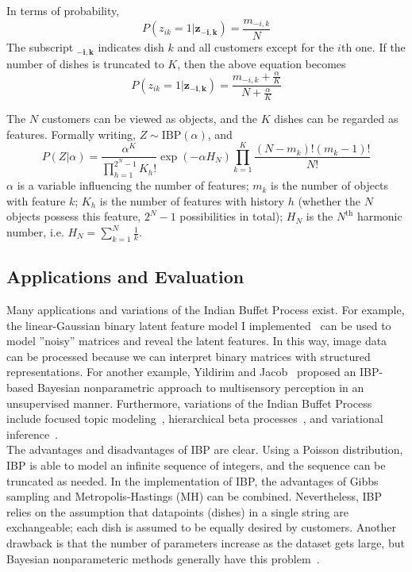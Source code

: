 In terms of probability, 
\begin{equation}
P(z_{ik}=1 | \mathbf{z_{-i,k}}) = \displaystyle \frac{m_{-i,k}}{N}
\end{equation}
The subscript $\mathbf{_{-i,k}}$ indicates dish $k$ and all customers except for the $i$th one. If the number of dishes is truncated to $K$, then the above equation becomes
\begin{equation}
P(z_{ik}=1 | \mathbf{z_{-i,k}}) = \displaystyle \frac{m_{-i,k} + \frac{\alpha}{K}}{N + \frac{\alpha}{K}}
\end{equation}

The $N$ customers can be viewed as objects, and the $K$ dishes can be regarded as features. Formally writing, $Z \sim \text{IBP}(\alpha)$, and
\begin{equation}
P(Z | \alpha) = \dfrac{\alpha^K}{\prod^{2^N-1}_{h=1}K_h!} \exp(-\alpha H_N) \prod^{K}_{k=1}\dfrac{(N-m_k)!(m_k-1)!}{N!}
\end{equation}
$\alpha$ is a variable influencing the number of features; $m_k$ is the number of objects with feature $k$; $K_h$ is the number of features with history $h$ (whether the $N$ objects possess this feature, $2^N-1$ possibilities in total); $H_N$ is the $N^{\text{th}}$ harmonic number, i.e. $H_N = \sum^{N}_{k=1}\frac{1}{k}$.

\subsection{Applications and Evaluation}
Many applications and variations of the Indian Buffet Process exist. For example, the linear-Gaussian binary latent feature model I implemented~\cite{griffiths2005infinite,ibp2012matlab} can be used to model ''noisy'' matrices and reveal the latent features. In this way, image data can be processed because we can interpret binary matrices with structured representations. For another example, Yildirim and Jacob~\cite{yildirimbayesian} proposed an IBP-based Bayesian nonparametric approach to multisensory perception in an unsupervised manner. Furthermore, variations of the Indian Buffet Process include focused topic modeling~\cite{williamson2009focused}, hierarchical beta processes~\cite{williamson2009focused}, and variational inference~\cite{doshi2008variational}. \\

The advantages and disadvantages of IBP are clear. Using a Poisson distribution, IBP is able to model an infinite sequence of integers, and the sequence can be truncated as needed. In the implementation of IBP, the advantages of Gibbs sampling and Metropolis-Hastings (MH) can be combined. Nevertheless, IBP relies on the assumption that datapoints (dishes) in a single string are exchangeable; each dish is assumed to be equally desired by customers. Another drawback is that the number of parameters increase as the dataset gets large, but Bayesian nonparameteric methods generally have this problem~\cite{ibp2012matlab}.
